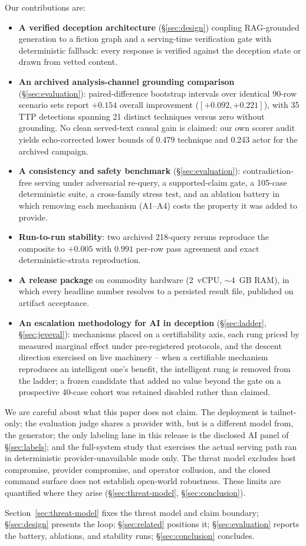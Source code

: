 \noindent Our contributions are:
\begin{itemize}
\item \textbf{A verified deception architecture} (\S\ref{sec:design})
coupling RAG-grounded generation to a fiction graph and a serving-time
verification gate with deterministic fallback: every response is verified
against the deception state or drawn from vetted content.
\item \textbf{An archived analysis-channel grounding comparison}
(\S\ref{sec:evaluation}): paired-difference bootstrap intervals over
identical 90-row scenario sets report $+0.154$ overall improvement
($[+0.092, +0.221]$), with 35 TTP detections spanning 21 distinct techniques
versus zero without grounding. No clean served-text causal gain is claimed:
our own scorer audit yields echo-corrected lower bounds of 0.479 technique
and 0.243 actor for the archived campaign.
\item \textbf{A consistency and safety benchmark} (\S\ref{sec:evaluation}):
contradiction-free serving under adversarial re-query, a supported-claim
gate, a 105-case deterministic suite, a cross-family stress test, and an
ablation battery in which removing each mechanism (A1--A4) costs the
property it was added to provide.
\item \textbf{Run-to-run stability}: two archived 218-query reruns
reproduce the composite to $+0.005$ with $0.991$ per-row pass agreement
and exact deterministic-strata reproduction.
\item \textbf{A release package} on commodity hardware
(2~vCPU, ${\sim}4$~GB RAM), in which every headline number resolves to a
persisted result file, published on artifact acceptance.
\item \textbf{An escalation methodology for AI in deception}
(\S\ref{sec:ladder}, \S\ref{sec:jeveval}): mechanisms placed on a
certifiability axis, each rung priced by measured marginal effect under
pre-registered protocols, and the descent direction exercised on live
machinery -- when a certifiable mechanism reproduces an intelligent
one's benefit, the intelligent rung is removed from the ladder; a frozen
candidate that added no value beyond the gate on a prospective 40-case
cohort was retained disabled rather than claimed.
\end{itemize}

We are careful about what this paper does not claim. The deployment is
tailnet-only; the evaluation judge shares a provider with, but is a
different model from, the generator; the only labeling lane in this
release is the disclosed AI panel of \S\ref{sec:labels}; and the
full-system study that exercises the actual serving path ran in
deterministic provider-unavailable mode only. The threat model excludes
host compromise, provider compromise, and operator collusion, and the
closed command surface does not establish open-world robustness. These
limits are quantified where they arise (\S\ref{sec:threat-model},
\S\ref{sec:conclusion}).

Section~\ref{sec:threat-model} fixes the threat model and claim
boundary; \S\ref{sec:design} presents the loop; \S\ref{sec:related}
positions it; \S\ref{sec:evaluation} reports the battery, ablations, and
stability runs; \S\ref{sec:conclusion} concludes.

